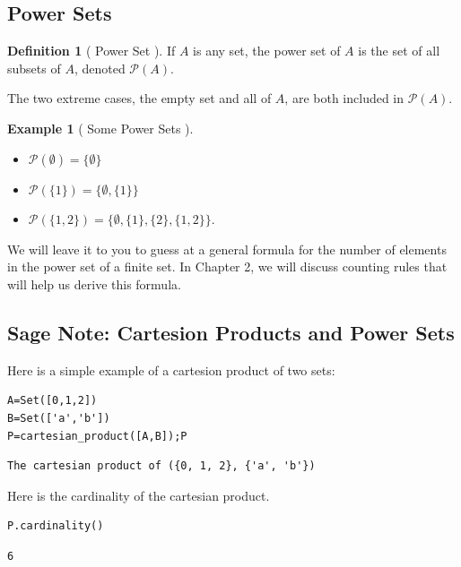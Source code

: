 \documentclass[10pt,]{book}
\theoremstyle{plain}
\theoremstyle{definition}
\newtheorem{definition}[theorem]{Definition}
\theoremstyle{definition}
\theoremstyle{definition}
\newtheorem{example}[theorem]{Example}
\theoremstyle{definition}
\begin{document}
\subsection[Power Sets]{Power Sets}\label{power-sets}
\begin{definition}[ Power Set ]\label{power-set}
\label{notation-12}
If \( A\) is any set, the power set of \(A\) is the set of all subsets of \(A\), denoted \(\mathcal{P}(A)\).%
\end{definition}
The two extreme cases, the empty set and all of \(A\), are both included in \(\mathcal{P}(A)\).%
\begin{example}[ Some Power Sets ]\label{Some_Power_Sets}
\leavevmode%
\begin{itemize}[label=\textbullet]
\item{}\(\mathcal{P}(\emptyset )=\{\emptyset \}\) %
\item{} \(\mathcal{P}(\{1\}) = \{\emptyset , \{1\}\}\) %
\item{} \(\mathcal{P}(\{1,2\}) = \{\emptyset , \{1\}, \{2\}, \{1, 2\}\}\). %
\end{itemize}
%
\par
We will leave it to you to guess at a general formula for the number of elements in the power set of a finite set. In Chapter 2, we will discuss counting rules that will help us derive this formula.%
\end{example}
\typeout{************************************************}
\typeout{************************************************}
\subsection[Sage Note: Cartesion Products and Power Sets]{Sage Note: Cartesion Products and Power Sets}\label{Sage_Note_Sets-1-3}
Here is a simple example of a cartesion product of two sets:%
\begin{lstlisting}[style=sageinput]
A=Set([0,1,2])
B=Set(['a','b'])
P=cartesian_product([A,B]);P
\end{lstlisting}
\begin{lstlisting}[style=sageoutput]
The cartesian product of ({0, 1, 2}, {'a', 'b'})
\end{lstlisting}
\par
Here is the cardinality of the cartesian product.%
\begin{lstlisting}[style=sageinput]
P.cardinality()
\end{lstlisting}
\begin{lstlisting}[style=sageoutput]
6
\end{lstlisting}
\par
\end{document}
